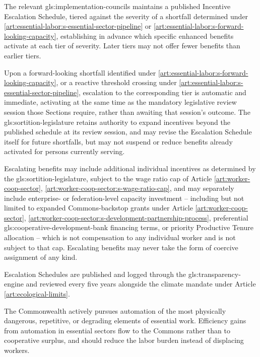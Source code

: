 The relevant \gls{gls:implementation-councils} maintains a published Incentive Escalation Schedule, tiered against the severity of a shortfall determined under \ref{art:essential-labor:s-essential-sector-pipeline} or \ref{art:essential-labor:s-forward-looking-capacity}, establishing in advance which specific enhanced benefits activate at each tier of severity. Later tiers may not offer fewer benefits than earlier tiers.

Upon a forward-looking shortfall identified under \ref{art:essential-labor:s-forward-looking-capacity}, or a reactive threshold crossing under \ref{art:essential-labor:s-essential-sector-pipeline}, escalation to the corresponding tier is automatic and immediate, activating at the same time as the mandatory legislative review session those Sections require, rather than awaiting that session's outcome. The \gls{gls:sortition-legislature} retains authority to expand incentives beyond the published schedule at its review session, and may revise the Escalation Schedule itself for future shortfalls, but may not suspend or reduce benefits already activated for persons currently serving.

Escalating benefits may include additional individual incentives as determined by the \gls{gls:sortition-legislature}, subject to the wage ratio cap of Article \ref{art:worker-coop-sector}, \ref{art:worker-coop-sector:s-wage-ratio-cap}, and may separately include enterprise- or federation-level capacity investment -- including but not limited to expanded Commons-backstop grants under Article \ref{art:worker-coop-sector}, \ref{art:worker-coop-sector:s-development-partnership-process}, preferential \gls{gls:cooperative-development-bank} financing terms, or priority Productive Tenure allocation -- which is not compensation to any individual worker and is not subject to that cap. Escalating benefits may never take the form of coercive assignment of any kind.

Escalation Schedules are published and logged through the \gls{gls:transparency-engine} and reviewed every five years alongside the climate mandate under Article \ref{art:ecological-limits}.

The Commonwealth actively pursues automation of the most physically dangerous, repetitive, or degrading elements of essential work. Efficiency gains from automation in essential sectors flow to the Commons rather than to cooperative surplus, and should reduce the labor burden instead of displacing workers.

